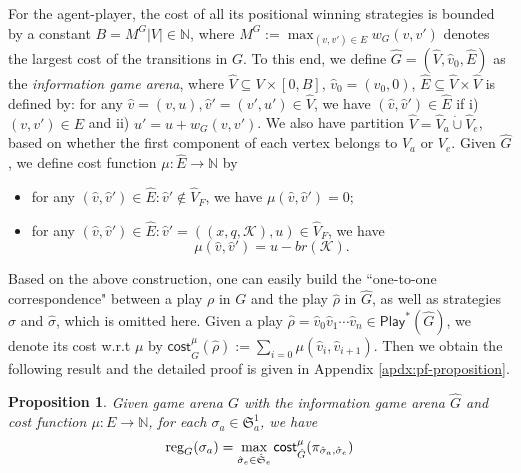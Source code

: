 \documentclass{ifacconf}
\newtheorem{proposition}{Proposition}
\def \K{\mathcal{K}}
\def \NN{\mathbb{N}}
\def \reg{\text{reg}}
\def \cost{\textsf{cost}}
\def \S{\mathfrak{S}}
\begin{document}
For the agent-player, the cost of all its positional winning strategies is bounded by a constant $B\!=\!M^G|V|\!\in\!\NN$, where $M^G\!:=\!\max_{(v,v')\in E}w_G(v,v')$ denotes the largest cost of the transitions in $G$. To this end, we define $\hat{G}\!=\!(\hat{V},\hat{v}_0,\hat{E})$ as the  \emph{information game arena}, where $\hat{V}\!\subseteq\! V\!\times\! [0,B]$, $\hat{v}_0\!=\!(v_0,0)$, $\hat{E}\subseteq \hat{V}\!\times\! \hat{V}$ is defined by: for any $\hat{v}\!=\!(v,u),\hat{v}'\!=\!(v',u')\!\in\!\hat{V}$, we have $(\hat{v},\hat{v}')\!\in\!\hat{E}$ if i) $(v,v')\!\in\! E$ and ii) $u'\!=\!u+w_G(v,v')$.
We also have partition $\hat{V}\!=\!\hat{V}_a\dot{\cup}\hat{V}_e$, based on whether the first component of each vertex belongs to $V_a$ or $V_e$.
Given $\hat{G}$, we define cost function $\mu\!:\!\hat{E}\!\to\!\NN$ by 
\begin{itemize}
    \item\hspace{-4pt} for any $(\hat{v},\hat{v}')\!\in\!\hat{E}\!:\!\hat{v}'\!\notin\!\hat{V}_F$, we have $\mu(\hat{v},\hat{v}')\!=\!0$;
    \item\hspace{-4pt} for any $(\hat{v},\hat{v}')\!\in\!\hat{E}\!:\!\hat{v}'\!=\!((x,q,\K),u)\!\in\!\hat{V}_F$, we have 
    \begin{equation}
        \mu(\hat{v},\hat{v}')\!=\!u-br(\K).
    \end{equation}
\end{itemize}

Based on the above construction, one can easily build the ``one-to-one correspondence" between a play $\rho$ in $G$ and the play $\hat{\rho}$ in $\hat{G}$, as well as strategies $\sigma$ and $\hat{\sigma}$, which is omitted here.
Given a play $\hat{\rho}\!=\!\hat{v}_0\hat{v}_1\cdots \hat{v}_n\!\in\! \textsf{Play}^*(\hat{G})$, we denote its cost w.r.t $\mu$ by $\cost_{\hat{G}}^\mu(\hat{\rho})\!:=\!\sum_{i=0}\mu(\hat{v}_i,\hat{v}_{i+1})$. Then we obtain the following result and the detailed proof is given in Appendix \ref{apdx:pf-proposition}.
 
\begin{proposition}\label{proposition}
Given game arena $G$ with the information game arena $\hat{G}$ and cost function $\mu\!:\!E\!\to\! \NN$, for each $\sigma_a\in\S_a^1$,
we have
\begin{equation}\vspace{-1pt}
    \reg_G(\sigma_a)=\max_{\hat{\sigma}_e\in\hat{\S}_e}\cost_{\hat{G}}^\mu(\pi_{\hat{\sigma}_a,\hat{\sigma}_e})
\end{equation}
\end{proposition}
\end{document}
